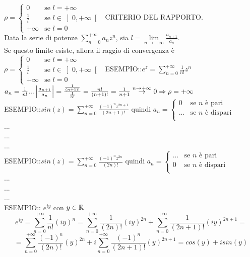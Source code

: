 $\rho =
	\begin{cases}
		0				&	\text{se }l=+\infty\\
		\frac{1}{l} 	&	\text{se }l\in\left]0,+\infty\right[\\
		+\infty 		& 	\text{se }l=0
	\end{cases}
$
\proposition CRITERIO DEL RAPPORTO.\\
Data la serie di potenze $\sum\limits_{n=0}^{+\infty}a_nz^n$, sia $l=\lim\limits_{n\to+\infty}\frac{a_{n+1}}{a_n}$.\\
Se questo limite esiste, allora il raggio di convergenza è
$\rho =
\begin{cases}
0				&	\text{se }l=+\infty\\
\frac{1}{l} 	&	\text{se }l\in\left]0,+\infty\right[\\
+\infty 		& 	\text{se }l=0
\end{cases}
$
ESEMPIO::$e^z=\sum\limits_{n=0}^{+\infty}\frac{1}{n!}z^n$\\
$a_n=\frac{1}{n!} ...  \left|\frac{a_{n+1}}{a_n}\right|=\frac{\frac{1}{(n+1)!}}{\frac{1}{n!}}=\frac{n!}{(n+1)!}=\frac{1}{n+1}\overset{n\to+\infty}{\to}0 \Rightarrow \rho=+\infty$\\
ESEMPIO::$sin(z)=\sum\limits_{n=0}^{+\infty}\frac{(-1)^nz^{2n+1}}{(2n+1)!}$ quindi
$a_n =
\begin{cases}
0		&	\text{se }n\text{ è pari}\\
...		&	\text{se }n\text{ è dispari}\\
\end{cases}
$\\
...\\
...\\
...\\
ESEMPIO::$sin(z)=\sum\limits_{n=0}^{+\infty}\frac{(-1)^nz^{2n}}{(2n)!}$ quindi
$a_n =
\begin{cases}
...		&	\text{se }n\text{ è pari}\\
0		&	\text{se }n\text{ è dispari}\\
\end{cases}
$\\
...\\
...\\
...\\
ESEMPIO:: $e^{iy}$ con $y\in \mathbb{R}$
\[e^{iy} = \sum\limits_{n=0}^{+\infty}\frac{1}{n!}(iy)^n = \sum\limits_{n=0}^{+\infty}\frac{1}{(2n)!}(iy)^{2n} + \sum\limits_{n=0}^{+\infty}\frac{1}{(2n+1)!}(iy)^{2n+1} = \]
\[ = \sum\limits_{n=0}^{+\infty}\frac{(-1)^n}{(2n)!}(y)^{2n} + i\sum\limits_{n=0}^{+\infty}\frac{(-1)^n}{(2n+1)!}(y)^{2n+1} = cos(y)+isin(y)\]
